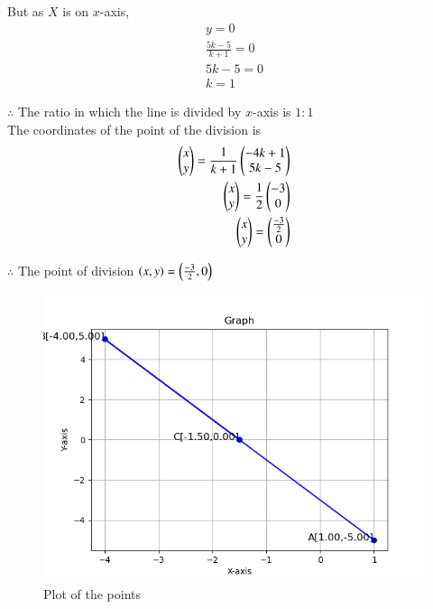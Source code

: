 \documentclass[journal]{IEEEtran}
\begin{document}
But as $X$ is on $x$-axis,
\begin{align}
y=0\\
\frac{5k-5}{k+1}=0 \label{eq1.1.5.10.6} \\
5k-5=0 \label{eq1.1.5.10.7} \\
k=1 \label{eq1.1.5.10.8}
\end{align}

$\therefore$ The ratio in which the line is divided by $x$-axis is $1:1$ \\
The coordinates of the point of the division is \\
\begin{align}
\begin{pmatrix}
x \\
y \\
\end{pmatrix}
=\frac{1}{k+1}
\begin{pmatrix}
-4k+1 \\
5k-5 \\
\end{pmatrix} \label{eq1.1.5.10.9}
\\
\begin{pmatrix}
x \\
y\\
\end{pmatrix}
=\frac{1}{2}
\begin{pmatrix}
-3 \\
0 \\
\end{pmatrix} \label{eq1.1.5.10.10}
\\
\begin{pmatrix}
x \\
y \\
\end{pmatrix}
=
\begin{pmatrix}
\frac{-3}{2} \\
0 \\
\end{pmatrix} \label{eq1.1.5.10.11}
\end{align}

$\therefore$ The point of division $\left(x,y\right)=\left(\frac{-3}{2},0\right)$

\begin{figure}[h!]
\renewcommand{\thefigure}{1}
    \centering
    \includegraphics[width=0.7\linewidth]{figs/plot.png}
    \caption{Plot of the points}
    \label{fig1.1.5.10.1}
\end{figure}
\end{document}
